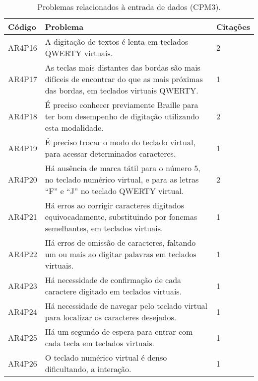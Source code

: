\begin{table}[htb]
  \begin{center}
    \ABNTEXfontereduzida
    \caption{Problemas relacionados à entrada de dados (CPM3).}
    \label{tab-pro-ent-dad-1}
    \begin{tabular}{p{1.2cm}|p{12.0cm}|p{1.3cm}}
      \textbf{Código} & \textbf{Problema}                                                                                                                   & \textbf{Citações} \\
      \hline
      AR4P16          & A digitação de textos é lenta em teclados QWERTY virtuais.                                                                          & 2                 \\
      \hline
      AR4P17          & As teclas mais distantes das bordas são mais difíceis de encontrar do que as mais próximas das bordas, em teclados virtuais QWERTY. & 1                 \\
      \hline
      AR4P18          & É preciso conhecer previamente Braille para ter bom desempenho de digitação utilizando esta modalidade.                             & 2                 \\
      \hline
      AR4P19          & É preciso trocar o modo do teclado virtual, para acessar determinados caracteres.                                                   & 1                 \\
      \hline
      AR4P20          & Há ausência de marca tátil para o número 5, no teclado numérico virtual, e para as letras “F” e “J” no teclado QWERTY virtual.      & 2                 \\
      \hline
      AR4P21          & Há erros ao corrigir caracteres digitados equivocadamente, substituindo por fonemas semelhantes, em teclados virtuais.              & 1                 \\
      \hline
      AR4P22          & Há erros de omissão de caracteres, faltando um ou mais ao digitar palavras em teclados virtuais.                                    & 1                 \\
      \hline
      AR4P23          & Há necessidade de confirmação de cada caractere digitado em teclados virtuais.                                                      & 1                 \\
      \hline
      AR4P24          & Há necessidade de navegar pelo teclado virtual para localizar os caracteres desejados.                                              & 1                 \\
      \hline
      AR4P25          & Há um segundo de espera para entrar com cada tecla em teclados virtuais.                                                            & 1                 \\
      \hline
      AR4P26          & O teclado numérico virtual é denso dificultando, a interação.                                                                       & 1                 \\
    \end{tabular}
  \end{center}
\end{table}

